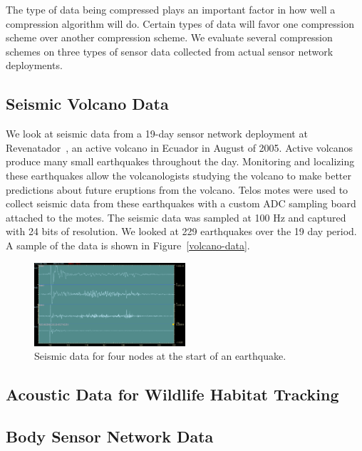 
The type of data being compressed plays an important factor in how
well a compression algorithm will do.  Certain types of data will
favor one compression scheme over another compression scheme.  We
evaluate several compression schemes on three types of sensor data
collected from actual sensor network deployments.  

\subsection{Seismic Volcano Data}

We look at seismic data from a 19-day sensor network deployment at
Revenatador~\cite{volcano-osdi06}, an active volcano in Ecuador in
August of 2005.  Active volcanos produce many small earthquakes
throughout the day.  Monitoring and localizing these earthquakes allow
the volcanologists studying the volcano to make better predictions
about future eruptions from the volcano.  Telos motes were used to
collect seismic data from these earthquakes with a custom ADC sampling
board attached to the motes.  The seismic data was sampled at 100 Hz
and captured with 24 bits of resolution.  We looked at 229 earthquakes
over the 19 day period.  A sample of the data is shown in
Figure~\ref{volcano-data}.

\begin{figure}[h]
  \centering
  \includegraphics[width=0.5\textwidth]{figures/volcano-data.png} 
  \caption{Seismic data for four nodes at the start of an earthquake.}
  \label{fig:volcano-data}
\end{figure}

\subsection{Acoustic Data for Wildlife Habitat Tracking}

\subsection{Body Sensor Network Data}
